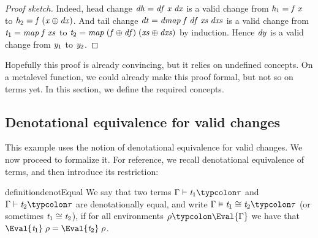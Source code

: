\begin{proof}[Proof sketch]
Indeed, head change \ensuremath{\Varid{dh}\mathrel{=}\Varid{df}\;\Varid{x}\;\Varid{dx}} is a valid change from
\ensuremath{\Varid{h}_{1}\mathrel{=}\Varid{f}\;\Varid{x}} to \ensuremath{\Varid{h}_{2}\mathrel{=}\Varid{f}\;(\Varid{x}\oplus \Varid{dx})}.
And tail change \ensuremath{\Varid{dt}\mathrel{=}\Varid{dmap}\;\Varid{f}\;\Varid{df}\;\Varid{xs}\;\Varid{dxs}} is a valid change from \ensuremath{\Varid{t}_{1}\mathrel{=}\Varid{map}\;\Varid{f}\;\Varid{xs}} to
\ensuremath{\Varid{t}_{2}\mathrel{=}\Varid{map}\;(\Varid{f}\oplus \Varid{df})\;(\Varid{xs}\oplus \Varid{dxs})} by
induction. Hence \ensuremath{\Varid{dy}} is a valid change from \ensuremath{\Varid{y}_{1}} to \ensuremath{\Varid{y}_{2}}.
\end{proof}
Hopefully this proof is already convincing, but it relies on
undefined concepts. On a metalevel function, we could already
make this proof formal, but not so on terms yet. In this section,
we define the required concepts.

\subsection{Denotational equivalence for valid changes}
\label{sec:denot-equivalence-valid}
This example uses the notion of denotational equivalence for valid
changes. We now proceed to formalize it.
For reference, we recall denotational equivalence of terms, and then
introduce its restriction:
\begin{restatable*}{definition}{denotEqual}
  \label{def:denot-equivalence}
  We say that two terms \ensuremath{\Gamma\vdash\Varid{t}_{1}\typcolon\tau} and \ensuremath{\Gamma\vdash\Varid{t}_{2}\typcolon\tau} are denotationally equal, and write \ensuremath{\Gamma\vDash\Varid{t}_{1}\cong\Varid{t}_{2}\typcolon\tau} (or sometimes \ensuremath{\Varid{t}_{1}\cong\Varid{t}_{2}}), if for all environments
  \ensuremath{\rho\typcolon\Eval{\Gamma}} we have that \ensuremath{\Eval{\Varid{t}_{1}}\;\rho\mathrel{=}\Eval{\Varid{t}_{2}}\;\rho}.
\end{restatable*}

